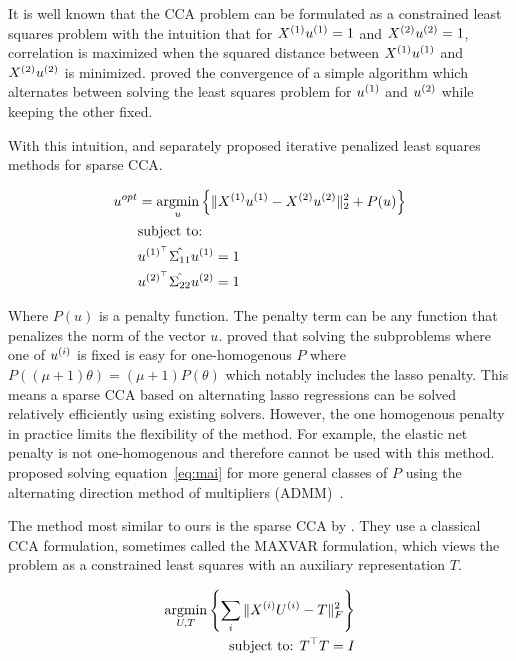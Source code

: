 It is well known that the CCA problem can be formulated as a constrained least squares problem with the intuition that
for \(X^{(1)} u^{(1)}=1\) and \(X^{(2)} u^{(2)}=1\), correlation is maximized when the squared distance
between \(X^{(1)} u^{(1)}\) and \(X^{(2)} u^{(2)}\) is minimized. \citep{golub1995canonical} proved the
convergence of a simple algorithm which alternates between solving the least squares problem for \(u^{(1)}\) and
\(u^{(2)}\) while keeping the other fixed.

With this intuition, \cite{wilms2015sparse} and \cite{mai2019iterative} separately proposed iterative penalized least
squares methods for sparse CCA\@.

\begin{align}
    \label{eq:mai}
    u^{opt} &= \underset{u}{\mathrm{argmin}} \left\{ \|X^{(1)}u^{(1)} - X^{(2)}u^{(2)}\|_2^2 + P(u) \right\} \\
    &\text{subject to:} \notag \\
    &u^{(1)^{\top}} \hat{\Sigma_{11}} u^{(1)}=1 \notag \\
    &u^{(2)^{\top}} \hat{\Sigma_{22}} u^{(2)}=1 \notag
\end{align}

Where \(P(u)\) is a penalty function.
The penalty term can be any function that penalizes the norm of the vector \(u\).
\citep{mai2019iterative} proved that solving the subproblems where one of $u^{(i)}$ is fixed is easy for one-homogenous $P$ where
\( P((\mu + 1)\theta) = (\mu + 1)P(\theta) \) which notably includes the lasso penalty.
This means a sparse CCA based
on alternating lasso regressions can be solved relatively efficiently using existing solvers.
However, the one homogenous penalty in practice limits the flexibility of the method.
For example, the elastic net penalty is not one-homogenous and therefore cannot be used with this method.\citep{
    kanatsoulis2018structured} proposed solving equation~\ref{eq:mai} for more general classes of $P$ using the
alternating direction method of multipliers (ADMM)~\citep{boyd2011distributed}.

The method most similar to ours is the sparse CCA by \cite{fu2017scalable}.
They use a classical CCA formulation, sometimes called the MAXVAR formulation, which views the problem as a constrained least squares with an auxiliary representation $T$\citep{carroll1968generalization,kettenring1971canonical}.


\begin{align}\label{eq:fu}
    \underset{U, T}{\mathrm{argmin}}\left\{\sum_i \|X^{(i)} U^{(i)} - T\|_F^2\right\}\\
    \text{subject to: }T^\top T = I\\
\end{align}

